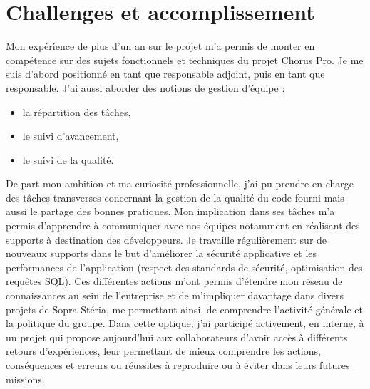 \documentclass[12pt,a4paper]{article}
\begin{document}
\section{Challenges et accomplissement}
Mon expérience de plus d'un an sur le projet m'a permis de monter en compétence sur des sujets fonctionnels et techniques du projet Chorus Pro. Je me suis d'abord positionné en tant que responsable adjoint, puis en tant que responsable. J'ai aussi aborder des notions de gestion d'équipe :
\smallbreak
\begin{itemize}
\item la répartition des tâches,
\item le suivi d'avancement,
\item le suivi de la qualité.
\end{itemize}
\medbreak
De part mon ambition et ma curiosité professionnelle, j'ai pu prendre en charge des tâches transverses concernant la gestion de la qualité du code fourni mais aussi le partage des bonnes pratiques.
\smallbreak
Mon implication dans ses tâches m'a permis d'apprendre à communiquer avec nos équipes notamment en réalisant des supports à destination des développeurs. Je travaille régulièrement sur de nouveaux supports dans le but d'améliorer la sécurité applicative et les performances de l'application (respect des standards de sécurité, optimisation des requêtes \gls{SQL}).
\medbreak
Ces différentes actions m'ont permis d'étendre mon réseau de connaissances au sein de l'entreprise et de m'impliquer davantage dans divers projets de Sopra Stéria, me permettant ainsi, de comprendre l'activité générale et la politique du groupe. Dans cette optique, j'ai participé activement, en interne, à un projet qui propose aujourd'hui aux collaborateurs d'avoir accès à différents retours d'expériences, leur permettant de mieux comprendre les actions, conséquences et erreurs ou réussites à reproduire ou à éviter dans leurs futures missions.
\newpage
\end{document}

